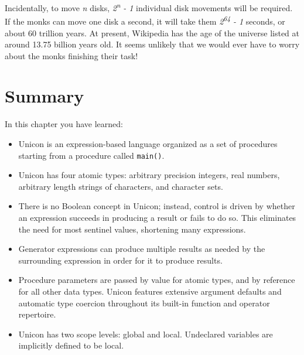 Incidentally, to move \textit{n} disks,
\textit{2}\textit{\textsuperscript{n}}\textit{ - 1} individual disk
movements will be required. If the monks can move one disk a second, it
will take them \textit{2}\textit{\textsuperscript{64}}\textit{ - 1}
seconds, or about 60 trillion years. At present, Wikipedia has the age of
the universe listed at around 13.75 billion years old. It seems unlikely
that we would ever have to worry about the monks finishing their
task!

\section*{Summary}

In this chapter you have learned:

\begin{itemize}\itemsep0pt
\item Unicon is an expression-based language organized as a set of
procedures starting from a procedure called \texttt{main()}.

\item Unicon has four atomic types: arbitrary precision integers, real
numbers, arbitrary length strings of characters, and character sets.

\item There is no Boolean concept in Unicon; instead, control is driven
by whether an expression succeeds in producing a result or
fails to do so. This eliminates the need for most
sentinel values, shortening many expressions.

\item {}Generator expressions can produce multiple
results as needed by the surrounding expression in order for it to
produce results.

\item Procedure parameters are passed by value for atomic types, and by
reference for all other data types. Unicon features extensive argument
defaults and automatic type coercion throughout its built-in function
and operator repertoire.

\item Unicon has two scope levels: global and local. Undeclared
variables are implicitly defined to be local.
\end{itemize}

\bigskip
